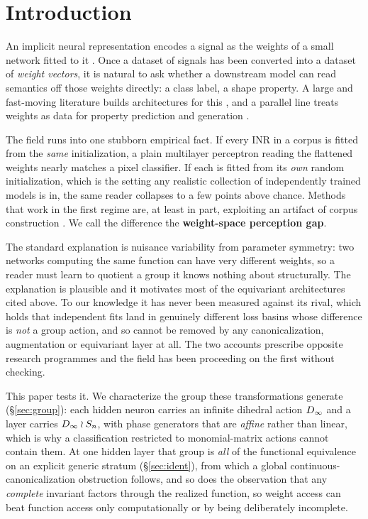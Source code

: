 \section{Introduction}
\label{sec:intro}

An implicit neural representation encodes a signal as the weights of a small network fitted to it
\citep{sitzmann2020siren,mildenhall2020nerf,tancik2020fourier}. Once a dataset of signals has been
converted into a dataset of \emph{weight vectors}, it is natural to ask whether a downstream model
can read semantics off those weights directly: a class label, a shape property. A large and
fast-moving literature builds architectures for this
\citep{navon2023dws,zhou2023nfn,lim2024gmn,kofinas2024graph,tran2024monomial,%
kalogeropoulos2024scalegmn}, and a parallel line treats weights as data for property prediction and
generation \citep{unterthiner2020predicting,schurholt2022zoos,erkoc2023hyperdiffusion}.

The field runs into one stubborn empirical fact. If every INR in a corpus is fitted from the
\emph{same} initialization, a plain multilayer perceptron reading the flattened weights nearly
matches a pixel classifier. If each is fitted from its \emph{own} random initialization, which is
the setting any realistic collection of independently trained models is in, the same reader
collapses to a few points above chance. Methods that work in the first regime are, at least in
part, exploiting an artifact of corpus construction
\citep{deluigi2023inr2vec,papa2024howtotrain}. We call the difference the \textbf{weight-space
perception gap}.

The standard explanation is nuisance variability from parameter symmetry: two networks computing
the same function can have very different weights, so a reader must learn to quotient a group it
knows nothing about structurally. The explanation is plausible and it motivates most of the
equivariant architectures cited above. To our knowledge it has never been measured against its
rival, which holds that independent fits land in genuinely different loss basins whose difference
is \emph{not} a group action, and so cannot be removed by any canonicalization, augmentation or
equivariant layer at all. The two accounts prescribe opposite research programmes and the field has
been proceeding on the first without checking.

This paper tests it. We characterize the group these transformations generate
(\S\ref{sec:group}): each hidden neuron carries an infinite dihedral action $D_\infty$ and a layer
carries $D_\infty \wr S_n$, with phase generators that are \emph{affine} rather than linear, which is
why a classification restricted to monomial-matrix actions cannot contain them. At one hidden layer
that group is \emph{all} of the functional equivalence on an explicit generic stratum
(\S\ref{sec:ident}), from which a global continuous-canonicalization obstruction follows, and so
does the observation that any \emph{complete} invariant factors through the realized function, so
weight access can beat function access only computationally or by being deliberately incomplete.

